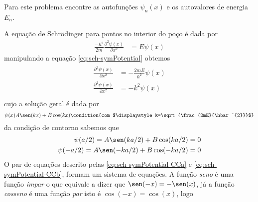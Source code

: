 \begin{prob}
\begin{center}
	\end{center}
	Para este problema encontre as autofunções $\psi_{n}(x)$ e os autovalores de energia $E_{n}$.
	\begin{sol}
		A equação de Schrödinger para pontos no interior do poço é dada por
		\begin{align}
			\frac{-\hbar^{2}}{2m}\frac{\partial^{2} \psi(x)}{\partial x^{2}} &= E \psi(x)
			\label{eq:sch-symPotential}
		\end{align}
		manipulando a equação \eqref{eq:sch-symPotential} obtemos
		\begin{align}
			\begin{split}
				\frac{\partial^{2} \psi(x)}{\partial x^{2}} &= -\frac{2mE}{\hbar^{2}} \psi(x)\\
				\frac{\partial^{2} \psi(x)}{\partial x^{2}} &= -k^{2} \psi(x)\\
			\end{split}
		\end{align}
		cujo a solução geral é dada por
		\begin{dmath*}
				\psi(x)A\sen(kx)+B\cos(kx)\condition{com $\displaystyle k=\sqrt{\frac{2mE}{\hbar^{2}}}$}
		\end{dmath*}
		da condição de contorno sabemos que
		\begin{subequations}
			\begin{align}
				\psi(a/2)=A\sen(ka/2)+B\cos(ka/2) &=0 \label{eq:sch-symPotential-CCa}\\
				\psi(-a/2)=A\sen(-ka/2)+B\cos(-ka/2) &= 0\label{eq:sch-symPotential-CCb}
			\end{align}
		\end{subequations}
		O par de equações descrito pelas \eqref{eq:sch-symPotential-CCa} e \eqref{eq:sch-symPotential-CCb}, formam um sistema de equações. A função \textit{seno} é uma função \textit{ímpar} o que equivale a dizer que $\sen(-x)=-\sen(x)$, já a função \textit{cosseno} é uma função \textit{par} isto é $\cos(-x)=\cos(x)$, logo
		\begin{align}

\end{align}
\end{sol}
\end{prob}

